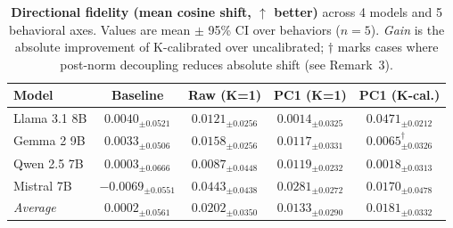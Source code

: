 \begin{table}[t]
  \centering
  \caption{
    \textbf{Directional fidelity (mean cosine shift, $\uparrow$ better)} across
    4 models and 5 behavioral axes. Values are mean $\pm$ 95\% CI over
    behaviors ($n{=}5$). \textit{Gain} is the absolute improvement of
    K-calibrated over uncalibrated; $\dagger$ marks cases where post-norm
    decoupling reduces absolute shift (see Remark~3).
  }
  \label{tab:directional_fidelity}
  \setlength{\tabcolsep}{5pt}
  \begin{tabular}{lcccc}
    \toprule
    \textbf{Model}
    & \textbf{Baseline}
    & \textbf{Raw (K=1)}
    & \textbf{PC1 (K=1)}
    & \textbf{PC1 (K-cal.)} \\
    \midrule
    Llama 3.1 8B & $0.0040_{\pm0.0521}$ & $0.0121_{\pm0.0256}$ & $0.0014_{\pm0.0325}$ & $0.0471_{\pm0.0212}$ \\
    Gemma 2 9B & $0.0033_{\pm0.0506}$ & $0.0158_{\pm0.0256}$ & $0.0117_{\pm0.0331}$ & $0.0065_{\pm0.0326}^{\dagger}$ \\
    Qwen 2.5 7B & $0.0003_{\pm0.0666}$ & $0.0087_{\pm0.0448}$ & $0.0119_{\pm0.0232}$ & $0.0018_{\pm0.0313}$ \\
    Mistral 7B & $-0.0069_{\pm0.0551}$ & $0.0443_{\pm0.0438}$ & $0.0281_{\pm0.0272}$ & $0.0170_{\pm0.0478}$ \\
    \midrule
    \textit{Average} & $0.0002_{\pm0.0561}$ & $0.0202_{\pm0.0350}$ & $0.0133_{\pm0.0290}$ & $0.0181_{\pm0.0332}$ \\
    \bottomrule
  \end{tabular}
\end{table}